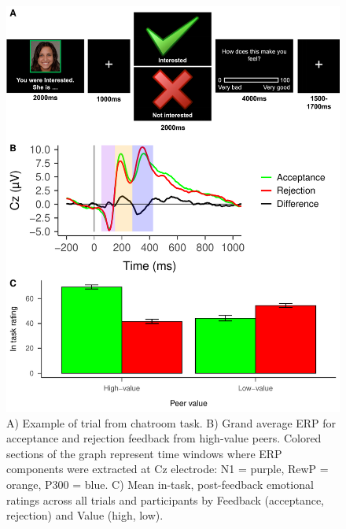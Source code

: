 \documentclass[
  man,floatsintext]{apa7}
\begin{document}
\begin{figure}
\centering
\includegraphics{BUDS_tables_and_figures_working_files/figure-latex/unnamed-chunk-6-1.pdf}
\caption{\label{fig:unnamed-chunk-6}A) Example of trial from chatroom task. B) Grand average ERP for acceptance and rejection feedback from high-value peers. Colored sections of the graph represent time windows where ERP components were extracted at Cz electrode: N1 = purple, RewP = orange, P300 = blue. C) Mean in-task, post-feedback emotional ratings across all trials and participants by Feedback (acceptance, rejection) and Value (high, low).}
\end{figure}
\end{document}
